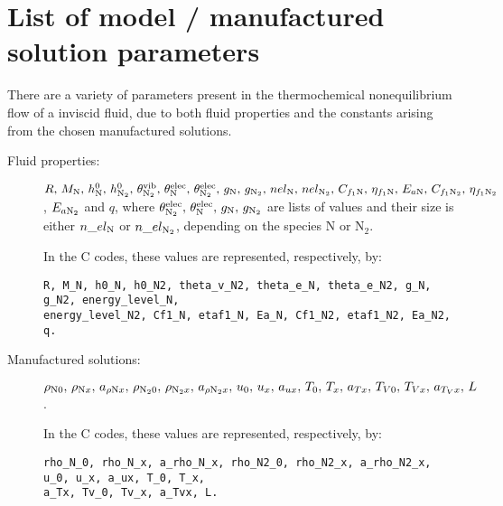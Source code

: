 \section{List of model / manufactured solution parameters}\label{Appendix:01}

There are a variety of parameters present in the thermochemical nonequilibrium flow of a inviscid fluid, due to both fluid properties and the constants arising from the chosen manufactured solutions.

\begin{description}
\item[Fluid properties:] $R , \, M_{\text{N}} , \,  h^0_{\text{N}} , \, h^0_{\text{N}_2} , \, \theta^{\text{vib}}_{\text{N}_2} , \, \theta^{\text{elec}}_{\text{N}} , \,  \theta^{\text{elec}}_{\text{N}_2} , \,   g_{\text{N}} , \,  g_{\text{N}_2} , \,  nel_{\text{N}} , \, nel_{\text{N}_2} , \,  C_{f_1 \text{N}} , \,  \eta_{f_1 \text{N}}  , \, E_{a\text{N}} , \,  C_{f_1 \text{N}_2} , \,  \eta_{f_1 \text{N}_2} $,  $E_{a\text{N}_2}$ and $ q$,  
where $ \theta^{\text{elec}}_{\text{N}_2} , \,  \theta^{\text{elec}}_{\text{N}} , \,  g_{\text{N}} , \,  g_{\text{N}_2}$ are lists of values and their size is either $n\_el_{\text{N}}$ or $n\_el_{\text{N}_2}$,  depending on the species N or N$_2$.

\vspace{10pt}
In the C codes, these values are represented, respectively, by:
\vspace{-5pt}
\begin{verbatim}
R, M_N, h0_N, h0_N2, theta_v_N2, theta_e_N, theta_e_N2, g_N, g_N2, energy_level_N, 
energy_level_N2, Cf1_N, etaf1_N, Ea_N, Cf1_N2, etaf1_N2, Ea_N2, q.

\end{verbatim}


\item[Manufactured solutions:] $\rho_{\text{N} 0} , \,  \rho_{\text{N} x} , \,  a_{  \rho \text{N} x } , \,  \rho_{\text{N}_2 0} , \, \rho_{\text{N}_2 x} , \,  a_{ \rho \text{N}_2 x } , \,  u_{0} , \, u_{x}  , \, a_{u x}  , \, 
 T_{0} , \, T_{x} , \,  a_{T x} , \,  T_{V0} , \, T_{Vx}  , \,  a_{T_V x} , \, L $.

\vspace{10pt}
In the C codes, these values are represented, respectively, by:
\vspace{-5pt}
\begin{verbatim} 
rho_N_0, rho_N_x, a_rho_N_x, rho_N2_0, rho_N2_x, a_rho_N2_x, u_0, u_x, a_ux, T_0, T_x,
a_Tx, Tv_0, Tv_x, a_Tvx, L.
\end{verbatim}
\end{description}


